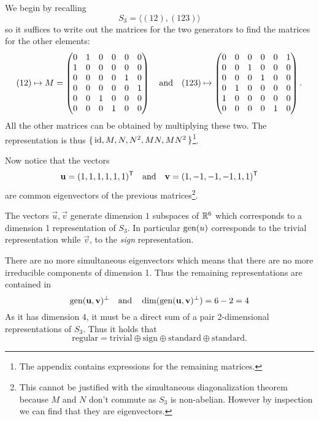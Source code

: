 \documentclass[12pt]{memoir}
\begin{document}
\begin{ptcbr}
We begin by recalling 
$$S_3=\langle (12),(123)\rangle$$ 
so it suffices to write out the matrices for the two generators to find the matrices for the other elements:
$$(12)\mapsto M=\begin{pmatrix}
    0&1&0&0&0&0\\
    1&0&0&0&0&0\\
    0&0&0&0&1&0\\
    0&0&0&0&0&1\\
    0&0&1&0&0&0\\
    0&0&0&1&0&0
\end{pmatrix}
\quad\text{and}\quad
(123)\mapsto \begin{pmatrix}
    0 & 0 & 0 & 0 & 0 & 1 \\
    0 & 0 & 1 & 0 & 0 & 0 \\
    0 & 0 & 0 & 1 & 0 & 0 \\
    0 & 1 & 0 & 0 & 0 & 0 \\
    1 & 0 & 0 & 0 & 0 & 0 \\
    0 & 0 & 0 & 0 & 1 & 0 \\
   \end{pmatrix}
.$$
All the other matrices can be obtained by multiplying these two. The representation is thus $\{\,\operatorname{id},M,N,N^2,MN,MN^2\,\}$\footnote{The appendix contains expressions for the remaining matrices.}.

Now notice that the vectors 
$$\mathbf{u}=(1,1,1,1,1,1)^{\mathsf{T}}\quad\text{and}\quad\mathbf{v}=(1,-1,-1,-1,1,1)^{\mathsf{T}}$$
 are common eigenvectors of the previous matrices\footnote{This cannot be justified with the simultaneous diagonalization theorem because $M$ and $N$ don't commute as $S_3$ is non-abelian. However by inspection we can find that they are eigenvectors.}.\par 
The vectors $\vec u,\vec v$ generate dimension $1$ subspaces of $\mathbb{R}^6$ which corresponds to a dimension 1 representation of $S_3$. In particular $\operatorname{gen}(u)$ corresponds to the trivial representation while $\vec{v}$, to the \emph{sign} representation.\par 
There are no more simultaneous eigenvectors which means that there are no more irreducible components of dimension 1. Thus the remaining representations are contained in 
$$\operatorname{gen}(\mathbf{u},\mathbf{v})^{\perp}\quad\text{and}\quad\dim(\operatorname{gen}(\mathbf{u},\mathbf{v})^{\perp})=6-2=4$$ 
As it has dimension $4$, it must be a direct sum of a pair 2-dimensional representations of $S_3$. Thus it holds that 
$$\text{regular}=\text{trivial}\oplus\text{sign}\oplus\text{standard}\oplus\text{standard}.$$
\end{ptcbr}
\end{document}
